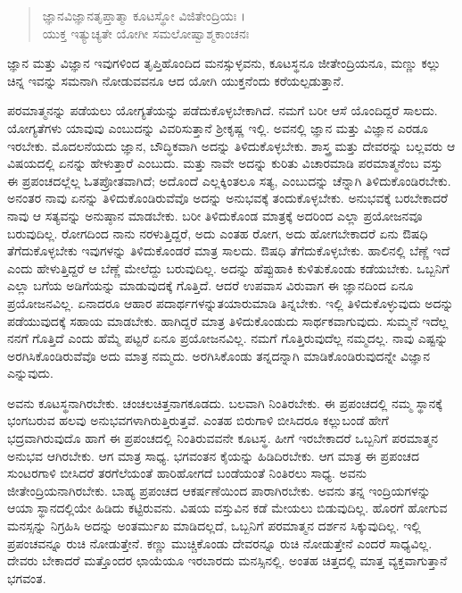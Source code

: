 \begin{verse}
ಜ್ಞಾನವಿಜ್ಞಾನತೃಪ್ತಾತ್ಮಾ ಕೂಟಸ್ಥೋ ವಿಜಿತೇಂದ್ರಿಯಃ ।\\ಯುಕ್ತ ಇತ್ಯುಚ್ಯತೇ ಯೋಗೀ ಸಮಲೋಷ್ವಾಶ್ಮಕಾಂಚನಃ 
\end{verse}

{\small ಜ್ಞಾನ ಮತ್ತು ವಿಜ್ಞಾನ ಇವುಗಳಿಂದ ತೃಪ್ತಿಹೊಂದಿದ ಮನಸ್ಸುಳ್ಳವನು, ಕೂಟಸ್ಥನೂ ಜೀತೇಂದ್ರಿಯನೂ, ಮಣ್ಣು ಕಲ್ಲು ಚಿನ್ನ ಇವನ್ನು ಸಮನಾಗಿ ನೋಡುವವನೂ ಆದ ಯೋಗಿ ಯುಕ್ತನೆಂದು ಕರೆಯಲ್ಪಡುತ್ತಾನೆ.}

ಪರಮಾತ್ಮನನ್ನು ಪಡೆಯಲು ಯೋಗ್ಯತೆಯನ್ನು ಪಡೆದುಕೊಳ್ಳಬೇಕಾಗಿದೆ. ನಮಗೆ ಬರೀ ಆಸೆ ಯೊಂದಿದ್ದರೆ ಸಾಲದು. ಯೋಗ್ಯತೆಗಳು ಯಾವುವು ಎಂಬುದನ್ನು ವಿವರಿಸುತ್ತಾನೆ ಶ್ರೀಕೃಷ್ಣ ಇಲ್ಲಿ. ಅವನಲ್ಲಿ ಜ್ಞಾನ ಮತ್ತು ವಿಜ್ಞಾನ ಎರಡೂ ಇರಬೇಕು. ಮೊದಲನೆಯದು ಜ್ಞಾನ, ಬೌದ್ಧಿಕವಾಗಿ ಅದನ್ನು ತಿಳಿದುಕೊಳ್ಳಬೇಕು. ಶಾಸ್ತ್ರ ಮತ್ತು ದೇವರನ್ನು ಬಲ್ಲವರು ಆ ವಿಷಯದಲ್ಲಿ ಏನನ್ನು ಹೇಳುತ್ತಾರೆ ಎಂಬುದು. ಮತ್ತು ನಾವೇ ಅದನ್ನು ಕುರಿತು ವಿಚಾರಮಾಡಿ ಪರಮಾತ್ಮನೆಂಬ ವಸ್ತು ಈ ಪ್ರಪಂಚದಲ್ಲೆಲ್ಲ ಓತಪ್ರೋತವಾಗಿದೆ; ಅದೊಂದೆ ಎಲ್ಲಕ್ಕಿಂತಲೂ ಸತ್ಯ, ಎಂಬುದನ್ನು ಚೆನ್ನಾಗಿ ತಿಳಿದುಕೊಂಡಿರಬೇಕು. ಅನಂತರ ನಾವು ಏನನ್ನು ತಿಳಿದುಕೊಂಡಿರುವೆವೊ ಅದನ್ನು ಅನುಭವಕ್ಕೆ ತಂದುಕೊಳ್ಳಬೇಕು. ಅನುಭವಕ್ಕೆ ಬರಬೇಕಾದರೆ ನಾವು ಆ ಸತ್ಯವನ್ನು ಅನುಷ್ಠಾನ ಮಾಡಬೇಕು. ಬರೀ ತಿಳಿದುಕೊಂಡ ಮಾತ್ರಕ್ಕೆ ಅದರಿಂದ ಎಲ್ಲಾ ಪ್ರಯೋಜನವೂ ಬರುವುದಿಲ್ಲ. ರೋಗದಿಂದ ನಾನು ನರಳುತ್ತಿದ್ದರೆ, ಅದು ಎಂತಹ ರೋಗ, ಅದು ಹೋಗಬೇಕಾದರೆ ಏನು ಔಷಧಿ ತೆಗೆದುಕೊಳ್ಳಬೇಕು ಇವುಗಳನ್ನು ತಿಳಿದುಕೊಂಡರೆ ಮಾತ್ರ ಸಾಲದು. ಔಷಧಿ ತೆಗೆದುಕೊಳ್ಳಬೇಕು. ಹಾಲಿನಲ್ಲಿ ಬೆಣ್ಣೆ ಇದೆ ಎಂದು ಹೇಳುತ್ತಿದ್ದರೆ ಆ ಬೆಣ್ಣೆ ಮೇಲೆದ್ದು ಬರುವುದಿಲ್ಲ. ಅದನ್ನು ಹೆಪ್ಪುಹಾಕಿ ಕುಳಿತುಕೊಂಡು ಕಡೆಯಬೇಕು. ಒಬ್ಬನಿಗೆ ಎಲ್ಲಾ ಬಗೆಯ ಅಡಿಗೆಯನ್ನು ಮಾಡುವುದಕ್ಕೆ ಗೊತ್ತಿದೆ. ಆದರೆ ಉಪವಾಸ ವಿರುವಾಗ ಈ ಜ್ಞಾನದಿಂದ ಏನೂ ಪ್ರಯೋಜನವಿಲ್ಲ. ಏನಾದರೂ ಆಹಾರ ಪದಾರ್ಥಗಳನ್ನುತಯಾರುಮಾಡಿ ತಿನ್ನಬೇಕು. ಇಲ್ಲಿ ತಿಳಿದುಕೊಳ್ಳುವುದು ಅದನ್ನು ಪಡೆಯುವುದಕ್ಕೆ ಸಹಾಯ ಮಾಡಬೇಕು. ಹಾಗಿದ್ದರೆ ಮಾತ್ರ ತಿಳಿದುಕೊಂಡುದು ಸಾರ್ಥಕವಾಗುವುದು. ಸುಮ್ಮನೆ ಇದೆಲ್ಲ ನನಗೆ ಗೊತ್ತಿದೆ ಎಂದು ಹೆಮ್ಮೆ ಪಟ್ಟರೆ ಏನೂ ಪ್ರಯೋಜನವಿಲ್ಲ. ನಮಗೆ ಗೊತ್ತಿರುವುದೆಲ್ಲ ನಮ್ಮದಲ್ಲ. ನಾವು ಎಷ್ಟನ್ನು ಅರಗಿಸಿಕೊಂಡಿರುವೆವೊ ಅದು ಮಾತ್ರ ನಮ್ಮದು. ಅರಗಿಸಿಕೊಂಡು ತನ್ನದನ್ನಾಗಿ ಮಾಡಿಕೊಂಡಿರುವುದನ್ನೇ ವಿಜ್ಞಾನ ಎನ್ನುವುದು.

ಅವನು ಕೂಟಸ್ಥನಾಗಿರಬೇಕು. ಚಂಚಲಚಿತ್ತನಾಗಕೂಡದು. ಬಲವಾಗಿ ನಿಂತಿರಬೇಕು. ಈ ಪ್ರಪಂಚದಲ್ಲಿ ನಮ್ಮ ಸ್ಥಾನಕ್ಕೆ ಭಂಗಬರುವ ಹಲವು ಅನುಭವಗಳಾಗಿರುತ್ತಿರುತ್ತವೆ. ಎಂತಹ ಬಿರುಗಾಳಿ ಬೀಸಿದರೂ ಕಲ್ಲುಬಂಡೆ ಹೇಗೆ ಭದ್ರವಾಗಿರುವುದೊ ಹಾಗೆ ಈ ಪ್ರಪಂಚದಲ್ಲಿ ನಿಂತಿರುವವನೇ ಕೂಟಸ್ಥ. ಹೀಗೆ ಇರಬೇಕಾದರೆ ಒಬ್ಬನಿಗೆ ಪರಮಾತ್ಮನ ಅನುಭವ ಆಗಿರಬೇಕು. ಆಗ ಮಾತ್ರ ಸಾಧ್ಯ. ಭಗವಂತನ ಕೈಯನ್ನು ಹಿಡಿದಿರಬೇಕು. ಆಗ ಮಾತ್ರ ಈ ಪ್ರಪಂಚದ ಸುಂಟರಗಾಳಿ ಬೀಸಿದರೆ ತರಗೆಲೆಯಂತೆ ಹಾರಿಹೋಗದೆ ಬಂಡೆಯಂತೆ ನಿಂತಿರಲು ಸಾಧ್ಯ. ಅವನು ಜೀತೇಂದ್ರಿಯನಾಗಿರಬೇಕು. ಬಾಹ್ಯ ಪ್ರಪಂಚದ ಆಕರ್ಷಣೆಯಿಂದ ಪಾರಾಗಿರಬೇಕು. ಅವನು ತನ್ನ ಇಂದ್ರಿಯಗಳನ್ನು ಆಯಾ ಸ್ಥಾನದಲ್ಲಿಯೇ ಹಿಡಿದು ಕಟ್ಟಿರುವನು. ವಿಷಯ ವಸ್ತುವಿನ ಕಡೆ ಮೇಯಲು ಬಿಡುವುದಿಲ್ಲ. ಹೊರಗೆ ಹೋಗುವ ಮನಸ್ಸನ್ನು ನಿಗ್ರಹಿಸಿ ಅದನ್ನು ಅಂತರ್ಮುಖ ಮಾಡಿದಲ್ಲದೆ, ಒಬ್ಬನಿಗೆ ಪರಮಾತ್ಮನ ದರ್ಶನ ಸಿಕ್ಕುವುದಿಲ್ಲ. ಇಲ್ಲಿ ಪ್ರಪಂಚವನ್ನೂ ರುಚಿ ನೋಡುತ್ತೇನೆ. ಕಣ್ಣು ಮುಚ್ಚಿಕೊಂಡು ದೇವರನ್ನೂ ರುಚಿ ನೋಡುತ್ತೇನೆ ಎಂದರೆ ಸಾಧ್ಯವಿಲ್ಲ. ದೇವರು ಬೇಕಾದರೆ ಮತ್ತೊಂದರ ಛಾಯೆಯೂ ಇರಬಾರದು ಮನಸ್ಸಿನಲ್ಲಿ. ಅಂತಹ ಚಿತ್ತದಲ್ಲಿ ಮಾತ್ತ ವ್ಯಕ್ತವಾಗುತ್ತಾನೆ ಭಗವಂತ.


